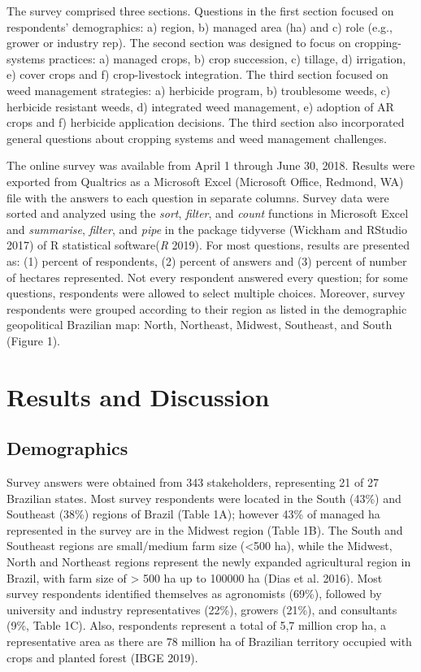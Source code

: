 \documentclass[
  12pt,
  a4paper]{article}
\begin{document}
The survey comprised three sections. Questions in the first section
focused on respondents' demographics: a) region, b) managed area (ha)
and c) role (e.g., grower or industry rep). The second section was
designed to focus on cropping-systems practices: a) managed crops, b)
crop succession, c) tillage, d) irrigation, e) cover crops and f)
crop-livestock integration. The third section focused on weed management
strategies: a) herbicide program, b) troublesome weeds, c) herbicide
resistant weeds, d) integrated weed management, e) adoption of AR crops
and f) herbicide application decisions. The third section also
incorporated general questions about cropping systems and weed
management challenges.

The online survey was available from April 1 through June 30, 2018.
Results were exported from Qualtrics as a Microsoft Excel (Microsoft
Office, Redmond, WA) file with the answers to each question in separate
columns. Survey data were sorted and analyzed using the \emph{sort},
\emph{filter}, and \emph{count} functions in Microsoft Excel and
\emph{summarise}, \emph{filter}, and \emph{pipe} in the package
tidyverse (Wickham and RStudio 2017) of R statistical software(\emph{R}
2019). For most questions, results are presented as: (1) percent of
respondents, (2) percent of answers and (3) percent of number of
hectares represented. Not every respondent answered every question; for
some questions, respondents were allowed to select multiple choices.
Moreover, survey respondents were grouped according to their region as
listed in the demographic geopolitical Brazilian map: North, Northeast,
Midwest, Southeast, and South (Figure 1).

\hypertarget{results-and-discussion}{%
\section{Results and Discussion}\label{results-and-discussion}}

\hypertarget{demographics}{%
\subsection{Demographics}\label{demographics}}

Survey answers were obtained from 343 stakeholders, representing 21 of
27 Brazilian states. Most survey respondents were located in the South
(43\%) and Southeast (38\%) regions of Brazil (Table 1A); however 43\%
of managed ha represented in the survey are in the Midwest region (Table
1B). The South and Southeast regions are small/medium farm size
(\textless500 ha), while the Midwest, North and Northeast regions
represent the newly expanded agricultural region in Brazil, with farm
size of \textgreater{} 500 ha up to 100000 ha (Dias et al. 2016). Most
survey respondents identified themselves as agronomists (69\%), followed
by university and industry representatives (22\%), growers (21\%), and
consultants (9\%, Table 1C). Also, respondents represent a total of 5,7
million crop ha, a representative area as there are 78 million ha of
Brazilian territory occupied with crops and planted forest (IBGE 2019).
\end{document}
